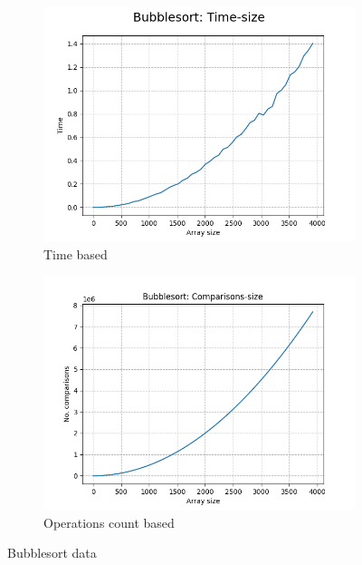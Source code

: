 \documentclass{article}
\begin{document}
            \begin{figure}[H]
                \begin{subfigure}{.5\textwidth}
                \centering
                    \includegraphics[scale=0.45]{images/bubblesort_grid_4k_50readings_time.png}
                    \caption{Time based}
                    \label{fig: time based bubble}
                \end{subfigure}
                \begin{subfigure}{.5\textwidth}
                \centering
                    \includegraphics[scale=0.45]{images/bubblesort_grid_4k_50readings_comparisons.png}
                    \caption{Operations count based}
                    \label{fig: op count based bubble}
                \end{subfigure}
                \caption{Bubblesort data}
            \end{figure}
\end{document}
